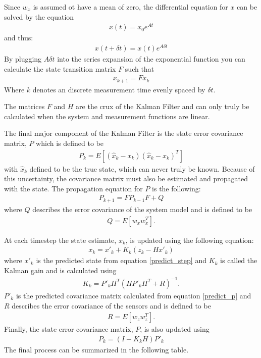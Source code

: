 Since $w_x$ is assumed ot have a mean of zero, the differential equation for $x$ can be solved by the equation
\begin{align}
x(t) = x_0e^{At}
\end{align}
and thus:
\begin{align}
x(t + \delta t) = x(t)e^{A\delta t}
\end{align}
By plugging $A\delta t$ into the series expansion of the exponential function you can calculate the state transition matrix $F$ such that
\begin{align}\label{predict_step}
x_{k+1} = Fx_{k}
\end{align}
Where $k$ denotes an discrete measurement time evenly spaced by $\delta t$.

The matrices $F$ and $H$ are the crux of the Kalman Filter and can only truly be calculated when the system and measurement functions are linear. 

The final major component of the Kalman Filter is the state error covariance matrix, $P$ which is defined to be \cite{kf_derivation}
\begin{align}
P_k = E[(\hat{x}_k - x_k)(\hat{x}_k - x_k)^T]
\end{align} 
with $\hat{x}_k$ defined to be the true state, which can never truly be known. Because of this uncertainty, the covariance matrix must also be estimated and propagated with the state. The propagation equation for $P$ is the following:
\begin{align}\label{predict_p}
P_{k+1} = FP_{k-1}F + Q
\end{align} 
where $Q$ describes the error covariance of the system model and is defined to be
\begin{align}
Q = E[w_xw_x^T].
\end{align} 

At each timestep the state estimate, $x_k$, is updated using the following equation:
\begin{align}
x_{k} = x'_{k} + K_k(z_k - Hx'_k)
\end{align} 
where $x'_k$ is the predicted state from equation \eqref{predict_step} and $K_k$ is called the Kalman gain and is calculated using
\begin{align}
K_k = P'_kH^T(HP'_kH^T + R)^{-1}.
\end{align} 
$P'_k$ is the predicted covariance matrix calculated from equation \eqref{predict_p} and $R$ describes the error covariance of the sensors and is defined to be
\begin{align}
R = E[w_zw_z^T].
\end{align} 
Finally, the state error covariance matrix, $P$, is also updated using
\begin{align}
P_k = (I - K_kH)P'_k
\end{align} 
The final process can be summarized in the following table.

